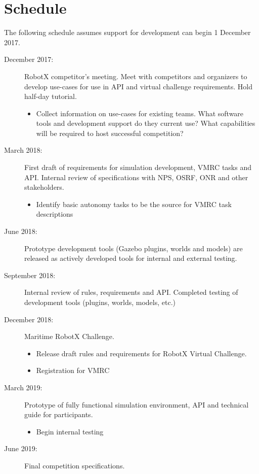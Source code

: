 \documentclass[11pt]{article}
\begin{document}
\section{Schedule}
The following schedule assumes support for development can begin 1 December 2017.
\begin{description}
\item[December 2017:] RobotX competitor's meeting.  Meet with competitors and organizers to develop use-cases for use in API and virtual challenge requirements.  Hold half-day tutorial.
  \begin{itemize}
  \item Collect information on use-cases for existing teams.  What software tools and development support do they current use?  What capabilities will be required to host successful competition?
  \end{itemize}
\item[March 2018:] First draft of requirements for simulation development, VMRC tasks and API.  Internal review of specifications with NPS, OSRF, ONR and other stakeholders.
  \begin{itemize} 
  \item Identify basic autonomy tasks to be the source for VMRC task descriptions
  \end{itemize}
\item[June 2018:] Prototype development tools (Gazebo plugins, worlds and models) are released as actively developed tools for internal and external testing.
\item[September 2018:] Internal review of rules, requirements and API.  Completed testing of development tools (plugins, worlds, models, etc.)
\item[December 2018:] Maritime RobotX Challenge.  
  \begin{itemize}
  \item Release draft rules and requirements for RobotX Virtual Challenge.
  \item Registration for VMRC
  \end{itemize}
\item[March 2019:] Prototype of fully functional simulation environment, API and technical guide for participants.
  \begin{itemize}
  \item Begin internal testing 
  \end{itemize}
\item[June 2019:] Final competition specifications.
  \begin{itemize}

\end{itemize}
\end{description}
\end{document}
